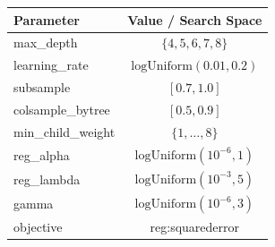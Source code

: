 \begin{tabular}{lc}
    \toprule
    Parameter          & Value / Search Space              \\
    \midrule
    max\_depth         & $\{4,5,6,7,8\}$                   \\
    learning\_rate     & $\mathrm{logUniform}(0.01, 0.2)$  \\
    subsample          & $[0.7, 1.0]$                      \\
    colsample\_bytree  & $[0.5, 0.9]$                      \\
    min\_child\_weight & $\{1,\dots,8\}$                   \\
    reg\_alpha         & $\mathrm{logUniform}(10^{-6}, 1)$ \\
    reg\_lambda        & $\mathrm{logUniform}(10^{-3}, 5)$ \\
    gamma              & $\mathrm{logUniform}(10^{-6}, 3)$ \\
    objective          & reg:squarederror                  \\
    \bottomrule
\end{tabular}